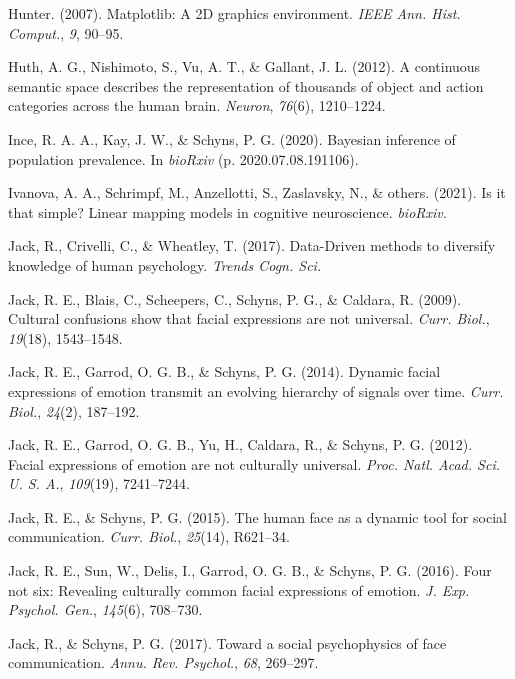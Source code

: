 \documentclass[11pt,american,a4paper,oneside,]{memoir} %
\begin{document}
\leavevmode\hypertarget{ref-Hunter2007-at}{}%
Hunter. (2007). Matplotlib: A 2D graphics environment. \emph{IEEE Ann. Hist. Comput.}, \emph{9}, 90--95.

\leavevmode\hypertarget{ref-Huth2012-yc}{}%
Huth, A. G., Nishimoto, S., Vu, A. T., \& Gallant, J. L. (2012). A continuous semantic space describes the representation of thousands of object and action categories across the human brain. \emph{Neuron}, \emph{76}(6), 1210--1224.

\leavevmode\hypertarget{ref-Ince2020-mr}{}%
Ince, R. A. A., Kay, J. W., \& Schyns, P. G. (2020). Bayesian inference of population prevalence. In \emph{bioRxiv} (p. 2020.07.08.191106).

\leavevmode\hypertarget{ref-Ivanova2021-wk}{}%
Ivanova, A. A., Schrimpf, M., Anzellotti, S., Zaslavsky, N., \& others. (2021). Is it that simple? Linear mapping models in cognitive neuroscience. \emph{bioRxiv}.

\leavevmode\hypertarget{ref-Jack2017-qp}{}%
Jack, R., Crivelli, C., \& Wheatley, T. (2017). Data-Driven methods to diversify knowledge of human psychology. \emph{Trends Cogn. Sci.}

\leavevmode\hypertarget{ref-Jack2009-yy}{}%
Jack, R. E., Blais, C., Scheepers, C., Schyns, P. G., \& Caldara, R. (2009). Cultural confusions show that facial expressions are not universal. \emph{Curr. Biol.}, \emph{19}(18), 1543--1548.

\leavevmode\hypertarget{ref-Jack2014-ku}{}%
Jack, R. E., Garrod, O. G. B., \& Schyns, P. G. (2014). Dynamic facial expressions of emotion transmit an evolving hierarchy of signals over time. \emph{Curr. Biol.}, \emph{24}(2), 187--192.

\leavevmode\hypertarget{ref-Jack2012-eq}{}%
Jack, R. E., Garrod, O. G. B., Yu, H., Caldara, R., \& Schyns, P. G. (2012). Facial expressions of emotion are not culturally universal. \emph{Proc. Natl. Acad. Sci. U. S. A.}, \emph{109}(19), 7241--7244.

\leavevmode\hypertarget{ref-Jack2015-sh}{}%
Jack, R. E., \& Schyns, P. G. (2015). The human face as a dynamic tool for social communication. \emph{Curr. Biol.}, \emph{25}(14), R621--34.

\leavevmode\hypertarget{ref-Jack2016-jq}{}%
Jack, R. E., Sun, W., Delis, I., Garrod, O. G. B., \& Schyns, P. G. (2016). Four not six: Revealing culturally common facial expressions of emotion. \emph{J. Exp. Psychol. Gen.}, \emph{145}(6), 708--730.

\leavevmode\hypertarget{ref-Jack2017-gt}{}%
Jack, R., \& Schyns, P. G. (2017). Toward a social psychophysics of face communication. \emph{Annu. Rev. Psychol.}, \emph{68}, 269--297.
\end{document}
